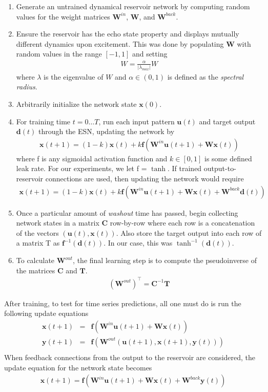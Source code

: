 \documentclass{acm_proc_article-sp}
\renewcommand{\vec}[1]{\mathbf{#1}}
\begin{document}
\begin{enumerate}
\item Generate an untrained dynamical reservoir network by computing random values for the weight matrices $\vec{W}^{in}$, $\vec{W}$, and $\vec{W}^{back}$.
\item Ensure the reservoir has the echo state property and displays mutually different dynamics upon excitement. This was done by populating $\vec{W}$ with random values in the range $[-1, 1]$ and setting
\begin{eqnarray*}
W = \frac{\alpha}{|\lambda_{max}|} W
\end{eqnarray*}
where $\lambda$ is the eigenvalue of $W$ and $\alpha \in (0,1)$ is defined as the \emph{spectral radius}.
\item Arbitrarily initialize the network state $\vec{x}(0)$.
\item For training time $t = 0 \ldots T$, run each input pattern $\vec{u}(t)$ and target output $\vec{d}(t)$ through the ESN, updating the network by
\begin{eqnarray*}
\vec{x}(t+1) = (1-k)\vec{x}(t) + k \vec{f}(\vec{W}^{in} \vec{u}(t+1) + \vec{W} \vec{x}(t))
\end{eqnarray*}
where f is any sigmoidal activation function and $k \in [0, 1]$ is some defined leak rate. For our experiments, we let f = $\tanh$. If trained output-to-reservoir connections are used, then updating the network would require
\begin{eqnarray*}
\vec{x}(t+1) = (1-k)\vec{x}(t) + k \vec{f}(\vec{W}^{in} \vec{u}(t+1) + \vec{W} \vec{x}(t) + \vec{W}^{back} \vec{d}(t))
\end{eqnarray*}
\item Once a particular amount of \emph{washout} time has passed, begin collecting network states in a matrix $\vec{C}$ row-by-row where each row is a concatenation of the vectors $(\vec{u}(t), \vec{x}(t))$. Also store the target output into each row of a matrix T as $\vec{f}^{-1}(\vec{d}(t))$. In our case, this was $\tanh^{-1}(\vec{d}(t))$.
\item To calculate $\vec{W}^{out}$, the final learning step is to compute the pseudoinverse of the matrices $\vec{C}$ and $\vec{T}$.
\begin{eqnarray*}
(\vec{W}^{out})^\top = \vec{C}^{-1} \vec{T}
\end{eqnarray*}
\end{enumerate}

After training, to test for time series predictions, all one must do is run the following update equations
\begin{eqnarray*}
\vec{x}(t+1) &=& \vec{f}(\vec{W}^{in} \vec{u}(t+1) + \vec{W} \vec{x}(t)) \\
\vec{y}(t+1) &=& \vec{f}(\vec{W}^{out} (\vec{u}(t+1), \vec{x}(t+1), \vec{y}(t))) \\
\end{eqnarray*}
When feedback connections from the output to the reservoir are considered, the update equation for the network state becomes
\begin{eqnarray*}
\vec{x}(t+1) = \vec{f}(\vec{W}^{in} \vec{u}(t+1) + \vec{W} \vec{x}(t) + \vec{W}^{back} \vec{y}(t))
\end{eqnarray*}
\end{document}
